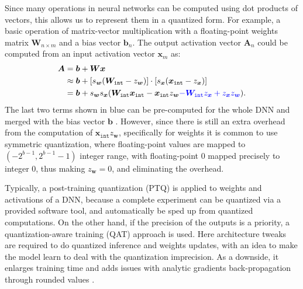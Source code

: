 Since many operations in neural networks can be computed using dot products of vectors, this allows us to represent them in a quantized form. For example, a basic operation of matrix-vector multiplication with a floating-point weights matrix $\bm{W}_{n \times m}$ and a bias vector $\bm{b}_n$. The output activation vector $\bm{A}_n$  could be computed from an input activation vector $\bm{x}_m$ as:
\setlength\abovedisplayskip{0pt}
\begin{align}
\begin{split}
	\bm{A} &= \bm{b} + \bm{W} \bm{x}\\
  &\approx \bm{b}
  + [s_{\bm{w}} (\bm{W}_{\mathtt{int}} - z_{\bm{w}})]
  \cdot [s_{\bm{x}} (\bm{x}_{\mathtt{int}} - z_{\bm{x}})] \\
  &=\bm{b}
  + s_{\bm{w}} s_{\bm{x}} ( 
  \bm{W}_{\mathtt{int}} \bm{x}_{\mathtt{int}}
  - \bm{x}_{\mathtt{int}} z_{\bm{w}}
  \textcolor{blue}{- \bm{W}_{\mathtt{int}} z_{\bm{x}}
  + z_{\bm{x}} z_{\bm{w}}}).
	\setlength\belowdisplayskip{2pt}
\end{split}
\end{align} The last two terms shown in blue can be pre-computed for the whole DNN and merged with the bias vector $\bm{b}$ \cite{dnn:quant-white21}. However, since there is still an extra overhead from the computation of $\bm{x}_{\mathtt{int}} z_{\bm{w}}$, specifically for weights it is common to use symmetric quantization, where floating-point values are mapped to $(-2^{b-1}, 2^{b-1}-1)$ integer range, with floating-point 0 mapped precisely to integer 0, thus making $z_{\bm{w}} = 0$, and eliminating the overhead. 

Typically, a post-training quantization (PTQ) is applied to weights and activations of a DNN, because a complete experiment can be quantized via a provided software tool, and automatically be sped up from quantized computations. On the other hand, if the precision of the outputs is a priority, a  quantization-aware training (QAT) \cite{quant:qat18} approach is used. Here architecture tweaks are required to do quantized inference and weights updates, with an idea to make the model learn to deal with the quantization imprecision. As a downside, it enlarges training time and adds issues with analytic gradients back-propagation through rounded values \cite{quant:straight-through-estimator13}.

